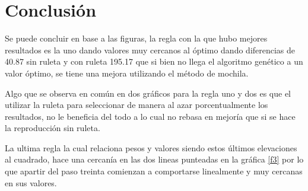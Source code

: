 \documentclass[a4paper, 11pt]{article}
\begin{document}
\section{Conclusión}

Se puede concluir en base a las figuras, la regla con la que hubo mejores resultados es la uno dando valores muy cercanos al óptimo dando diferencias de 40.87 sin ruleta y con ruleta 195.17 que si bien no llega el algoritmo genético a un valor óptimo, se tiene una mejora utilizando el método de mochila.

Algo que se observa en común en dos gráficos para la regla uno y dos es que el utilizar la ruleta para seleccionar de manera al azar porcentualmente los resultados, no le beneficia del todo a lo cual no rebasa en mejoría que si se hace la reproducción sin ruleta.

La ultima regla la cual relaciona pesos y valores siendo estos últimos elevaciones al cuadrado, hace una cercanía en las dos lineas punteadas en la gráfica \ref{f3} por lo que apartir del paso treinta comienzan a comportarse linealmente y muy cercanas en sus valores.



\end{document}
